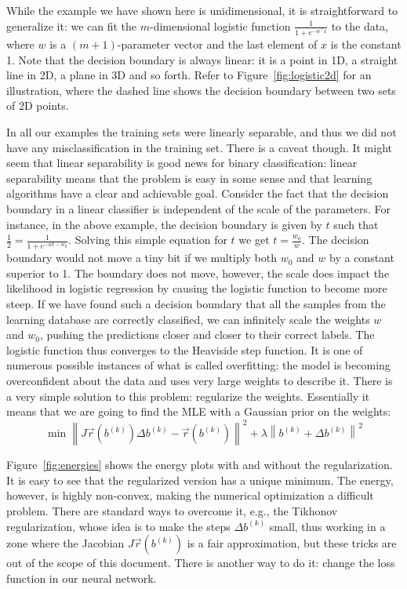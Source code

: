 \documentclass[notitlepage,oneside]{book}
\begin{document}
While the example we have shown here is unidimensional, it is straightforward to generalize it: we can fit the $m$-dimensional logistic function
$\frac{1}{1+e^{-w^\top x}}$ to the data, where $w$ is a $(m+1)$-parameter vector and the last element of $x$ is the constant 1.
Note that the decision boundary is always linear: it is a point in 1D, a straight line in 2D, a plane in 3D and so forth.
Refer to Figure~\ref{fig:logistic2d} for an illustration, where the dashed line shows the decision boundary between two sets of 2D points.

In all our examples the training sets were linearly separable, and thus we did not have any misclassification in the training set.
There is a caveat though. It might seem that linear separability is good news for binary classification:
linear separability means that the problem is easy in some sense and that learning algorithms have a clear and achievable goal.
Consider the fact that the decision boundary in a linear classifier is independent of the scale of the parameters.
For instance, in the above example, the decision boundary is given by $t$ such that $\frac{1}{2} = \frac{1}{1+e^{-wt - w_0}}$.
Solving this simple equation for $t$ we get $t=\frac{w_0}{w}$.
The decision boundary would not move a tiny bit if we multiply both $w_0$ and $w$ by a constant superior to 1.
The boundary does not move, however, the scale does impact the likelihood in logistic regression by causing the logistic function to become more steep.
If we have found such a decision boundary that all the samples from the learning database are correctly classified,
we can infinitely scale the weights $w$ and $w_0$, pushing the predictions closer and closer to their correct labels.
The logistic function thus converges to the Heaviside step function.
It is one of numerous possible instances of what is called overfitting:
the model is becoming overconfident about the data and uses very large weights to describe it.
There is a very simple solution to this problem: regularize the weights.
Essentially it means that we are going to find the MLE with a Gaussian prior on the weights:
$$
\min \left\| J\vec{r}\left(b^{(k)}\right) \Delta b^{(k)} - \vec{r}\left(b^{(k)}\right) \right\|^2 + \lambda \left\|b^{(k)} + \Delta b^{(k)}\right\|^2
$$

Figure~\ref{fig:energies} shows the energy plots with and without the regularization. It is easy to see that the regularized version has a unique minimum.
The energy, however, is highly non-convex, making the numerical optimization a difficult problem.
There are standard ways to overcome it, e.g., the Tikhonov regularization, whose idea is to make the steps $\Delta b^{(k)} $ small, thus working 
in a zone where the Jacobian $J\vec{r}\left(b^{(k)}\right)$ is a fair approximation, but these tricks are out of the scope of this document.
There is another way to do it: change the loss function in our neural network.
\end{document}
